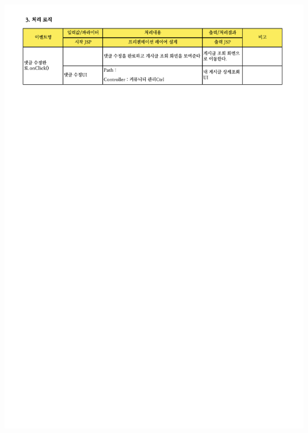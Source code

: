 {{{{{{{{{{{{{{{{{{{{{{{{{{{{{{{{{{{{{{{{{{{{{{{{{{{{{{{\includegraphics[width=20cm]{./Figure/Analysis/Display/community/community_14.pdf} \\
}}}}}}}}}}}}}}}}}}}}}}}}}}}}}}}}}}}}}}}}}}}}}}}}}}}}}}}
